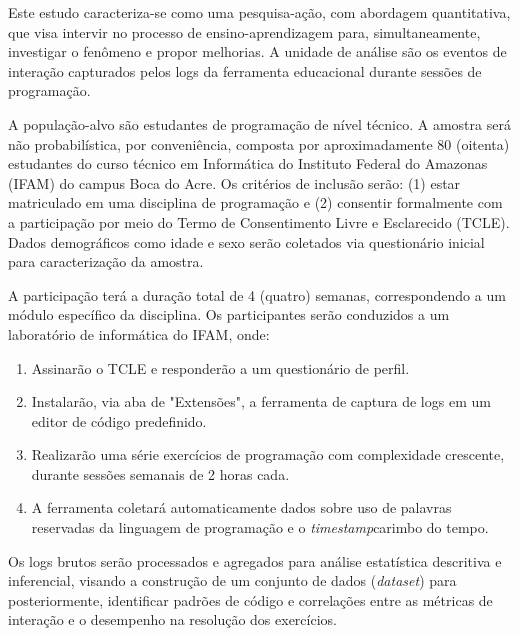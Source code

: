 \documentclass[10pt,a4paper]{article}
\begin{document}
\begin{enumerate}
Este estudo caracteriza-se como uma pesquisa-ação, com abordagem quantitativa, que visa intervir no processo de ensino-aprendizagem para, simultaneamente, investigar o fenômeno e propor melhorias. A unidade de análise são os eventos de interação capturados pelos logs da ferramenta educacional durante sessões de programação.

A população-alvo são estudantes de programação de nível técnico. A amostra será não probabilística, por conveniência, composta por aproximadamente 80 (oitenta) estudantes do curso técnico em Informática do Instituto Federal do Amazonas (IFAM) do campus Boca do Acre. Os critérios de inclusão serão: (1) estar matriculado em uma disciplina de programação e (2) consentir formalmente com a participação por meio do Termo de Consentimento Livre e Esclarecido (TCLE). Dados demográficos como idade e sexo serão coletados via questionário inicial para caracterização da amostra.

A participação terá a duração total de 4 (quatro) semanas, correspondendo a um módulo específico da disciplina. Os participantes serão conduzidos a um laboratório de informática do IFAM, onde:

\begin{enumerate}
\item Assinarão o TCLE e responderão a um questionário de perfil.
\item Instalarão, via aba de "Extensões", a ferramenta de captura de logs em um editor de código predefinido.
\item Realizarão uma série exercícios de programação com complexidade crescente, durante sessões semanais de 2 horas cada.
\item A ferramenta coletará automaticamente dados sobre uso de palavras reservadas da linguagem de programação e o \textit{timestamp}{carimbo do tempo}.
\end{enumerate}

Os logs brutos serão processados e agregados para análise estatística descritiva e inferencial, visando a construção de um conjunto de dados (\textit{dataset}) para posteriormente, identificar padrões de código e correlações entre as métricas de interação e o desempenho na resolução dos exercícios.


\end{enumerate}
\end{document}
